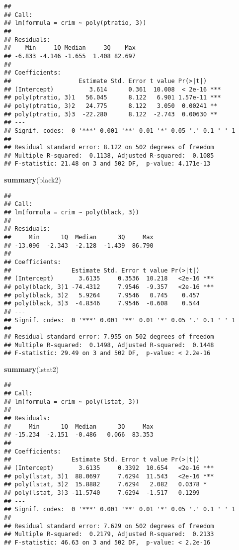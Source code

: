 \documentclass[]{article}
\newenvironment{Shaded}{\begin{snugshade}}{\end{snugshade}}
\newcommand{\KeywordTok}[1]{\textcolor[rgb]{0.13,0.29,0.53}{\textbf{#1}}}
\newcommand{\NormalTok}[1]{#1}
\begin{document}
\begin{verbatim}
## 
## Call:
## lm(formula = crim ~ poly(ptratio, 3))
## 
## Residuals:
##    Min     1Q Median     3Q    Max 
## -6.833 -4.146 -1.655  1.408 82.697 
## 
## Coefficients:
##                   Estimate Std. Error t value Pr(>|t|)    
## (Intercept)          3.614      0.361  10.008  < 2e-16 ***
## poly(ptratio, 3)1   56.045      8.122   6.901 1.57e-11 ***
## poly(ptratio, 3)2   24.775      8.122   3.050  0.00241 ** 
## poly(ptratio, 3)3  -22.280      8.122  -2.743  0.00630 ** 
## ---
## Signif. codes:  0 '***' 0.001 '**' 0.01 '*' 0.05 '.' 0.1 ' ' 1
## 
## Residual standard error: 8.122 on 502 degrees of freedom
## Multiple R-squared:  0.1138, Adjusted R-squared:  0.1085 
## F-statistic: 21.48 on 3 and 502 DF,  p-value: 4.171e-13
\end{verbatim}

\begin{Shaded}
\begin{Highlighting}[]
\KeywordTok{summary}\NormalTok{(black2)}
\end{Highlighting}
\end{Shaded}

\begin{verbatim}
## 
## Call:
## lm(formula = crim ~ poly(black, 3))
## 
## Residuals:
##     Min      1Q  Median      3Q     Max 
## -13.096  -2.343  -2.128  -1.439  86.790 
## 
## Coefficients:
##                 Estimate Std. Error t value Pr(>|t|)    
## (Intercept)       3.6135     0.3536  10.218   <2e-16 ***
## poly(black, 3)1 -74.4312     7.9546  -9.357   <2e-16 ***
## poly(black, 3)2   5.9264     7.9546   0.745    0.457    
## poly(black, 3)3  -4.8346     7.9546  -0.608    0.544    
## ---
## Signif. codes:  0 '***' 0.001 '**' 0.01 '*' 0.05 '.' 0.1 ' ' 1
## 
## Residual standard error: 7.955 on 502 degrees of freedom
## Multiple R-squared:  0.1498, Adjusted R-squared:  0.1448 
## F-statistic: 29.49 on 3 and 502 DF,  p-value: < 2.2e-16
\end{verbatim}

\begin{Shaded}
\begin{Highlighting}[]
\KeywordTok{summary}\NormalTok{(lstat2)}
\end{Highlighting}
\end{Shaded}

\begin{verbatim}
## 
## Call:
## lm(formula = crim ~ poly(lstat, 3))
## 
## Residuals:
##     Min      1Q  Median      3Q     Max 
## -15.234  -2.151  -0.486   0.066  83.353 
## 
## Coefficients:
##                 Estimate Std. Error t value Pr(>|t|)    
## (Intercept)       3.6135     0.3392  10.654   <2e-16 ***
## poly(lstat, 3)1  88.0697     7.6294  11.543   <2e-16 ***
## poly(lstat, 3)2  15.8882     7.6294   2.082   0.0378 *  
## poly(lstat, 3)3 -11.5740     7.6294  -1.517   0.1299    
## ---
## Signif. codes:  0 '***' 0.001 '**' 0.01 '*' 0.05 '.' 0.1 ' ' 1
## 
## Residual standard error: 7.629 on 502 degrees of freedom
## Multiple R-squared:  0.2179, Adjusted R-squared:  0.2133 
## F-statistic: 46.63 on 3 and 502 DF,  p-value: < 2.2e-16
\end{verbatim}
\end{document}
